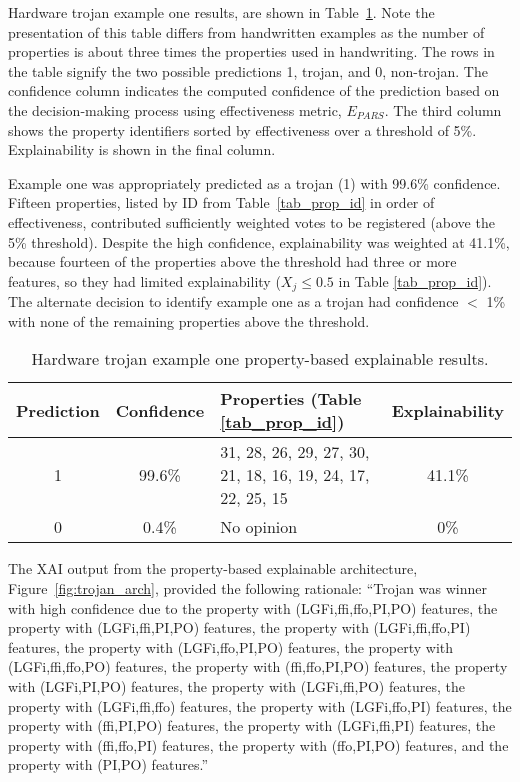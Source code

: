 Hardware trojan example one results, are shown in Table~\ref{tab_prop_exp_ex_1}.
Note the presentation of this table differs from handwritten examples as the
number of properties is about three times the properties used in handwriting.
The rows in the table signify the two possible predictions 1, trojan, and 0,
non-trojan. The confidence column indicates the computed confidence of the
prediction based on the decision-making process using effectiveness metric,
$E_{PARS}$.  The third column shows the property identifiers sorted by
effectiveness over a threshold of 5\%. Explainability is shown in the final
column.

Example one  was appropriately predicted as a trojan (1) with 99.6\% confidence.
Fifteen properties, listed by ID from Table~\ref{tab_prop_id} in order of
effectiveness, contributed sufficiently weighted votes to be registered (above
the 5\% threshold).  Despite the high confidence, explainability was weighted at
41.1\%, because fourteen of the properties above the threshold had three or more
features, so they had limited explainability ($X_j\leq0.5$ in Table
\ref{tab_prop_id}). The alternate decision to identify example one as a trojan
had confidence $<$ 1\% with none of the remaining properties above the
threshold.

\begin{table}[H]
    \renewcommand{\arraystretch}{1.3}
    \centering
    \caption{Hardware trojan example one property-based explainable results.}
    \begin{tabular}{|c|c|p{}|c|}
        \hline
         Prediction &  Confidence &  Properties (Table \ref{tab_prop_id}) &  Explainability \\
        \hline
        \hline
        1 & 99.6\% & 31, 28, 26, 29, 27, 30, 21, 18, 16, 19, 24, 17, 22, 25, 15 & 41.1\% \\
        \hline
        0 & 0.4\% & No opinion & 0\% \\
        \hline
    \end{tabular}
    \label{tab_prop_exp_ex_1}
\end{table}

The XAI output from the property-based explainable architecture,
Figure~\ref{fig:trojan_arch}, provided the following rationale: ``Trojan was
winner with high confidence due to the property with (LGFi,ffi,ffo,PI,PO)
features, the property with (LGFi,ffi,PI,PO) features, the property with
(LGFi,ffi,ffo,PI) features, the property with (LGFi,ffo,PI,PO) features, the
property with (LGFi,ffi,ffo,PO) features, the property with (ffi,ffo,PI,PO)
features, the property with (LGFi,PI,PO) features, the property with
(LGFi,ffi,PO) features, the property with (LGFi,ffi,ffo) features, the property
with (LGFi,ffo,PI) features, the property with (ffi,PI,PO) features, the
property with (LGFi,ffi,PI) features, the property with (ffi,ffo,PI) features,
the property with (ffo,PI,PO) features, and the property with (PI,PO)
features.''

